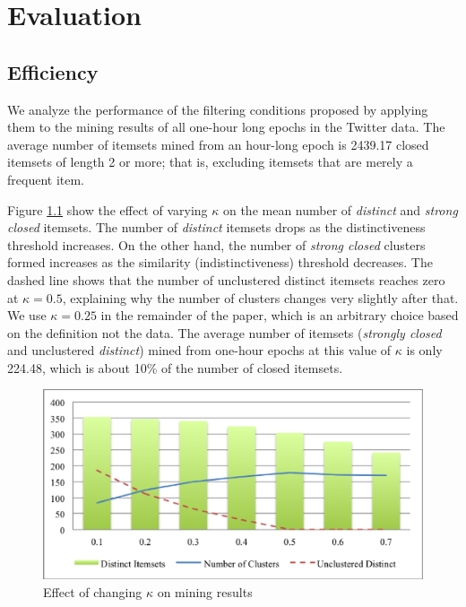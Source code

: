 \documentclass[letterpaper,12pt,titlepage,oneside,final]{book}
\begin{document}
\chapter{Evaluation}
\label{sec:empirical}


\section{Efficiency}
\label{sec:bounding}
We analyze the performance of the filtering conditions proposed by applying
them to the mining results of all one-hour long epochs in the Twitter data.
The average number of itemsets mined from an hour-long epoch is
2439.17 closed itemsets of length 2 or more;
that is, excluding itemsets that are merely a frequent item.


Figure \ref{fig:kappa} show the effect of varying $\kappa$ on the mean number
of \emph{distinct} and \emph{strong closed} itemsets.
The number of \emph{distinct} itemsets drops as the distinctiveness threshold
increases.
On the other hand, the number of \emph{strong closed} clusters formed increases
as the similarity (indistinctiveness) threshold decreases.
The dashed line shows that the number of unclustered distinct itemsets reaches
zero at $\kappa=0.5$, explaining why the number of clusters changes very
slightly after that. 
We use $\kappa = 0.25$ in the remainder of the paper,
which is an arbitrary choice based on the definition not the data.
The average number of itemsets (\emph{strongly closed} and unclustered
\emph{distinct}) mined from one-hour epochs at this value of
$\kappa$ is only 224.48, which is about 10\% of the number of closed itemsets.



\begin{figure}

\includegraphics{kappa_effect.eps}
\caption{Effect of changing $\kappa$ on mining results }
\label{fig:kappa}
\end{figure}
\end{document}
